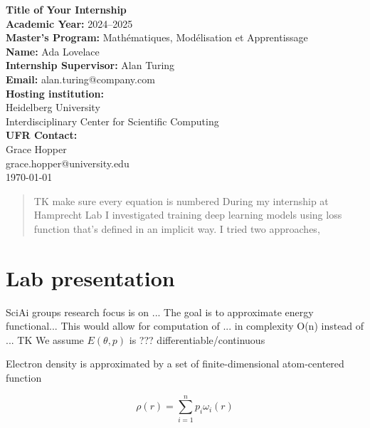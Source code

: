 \documentclass[a4paper,10pt]{report}
\author{Łukasz Adamowicz}
\begin{document}
\begin{titlepage}
    \begin{center}
        \textbf{\Large Title of Your Internship}\\[2cm]
        \textbf{Academic Year:} 2024--2025\\
        \textbf{Master's Program:} Mathématiques, Modélisation et Apprentissage\\
        \textbf{Name:} Ada Lovelace\\[1cm]
        \textbf{Internship Supervisor:} Alan Turing\\
        \textbf{Email:} alan.turing@company.com\\[1cm]
        \textbf{Hosting institution:}\\
        Heidelberg University\\
        Interdisciplinary Center for Scientific Computing\\
        \textbf{UFR Contact:}\\
        Grace Hopper\\
        grace.hopper@university.edu\\[2cm]

        \vfill
        \today
    \end{center}
\end{titlepage}


\begin{abstract}
TK make sure every equation is numbered
During my internship at Hamprecht Lab I investigated training deep learning models using loss function that's defined in an implicit way. I tried two approaches,
\end{abstract}


\tableofcontents

\section{Lab presentation}
SciAi groups research focus is on ...
The goal is to approximate energy functional...
This would allow for computation of ... in complexity O(n) instead of ...
TK
We assume $E(\theta, p)$ is ??? differentiable/continuous

Electron density is approximated by a set of finite-dimensional  atom-centered function


\begin{equation}
 \rho(r) = \sum_{i=1}^n p_i \omega_i(r)
\end{equation}
\end{document}
